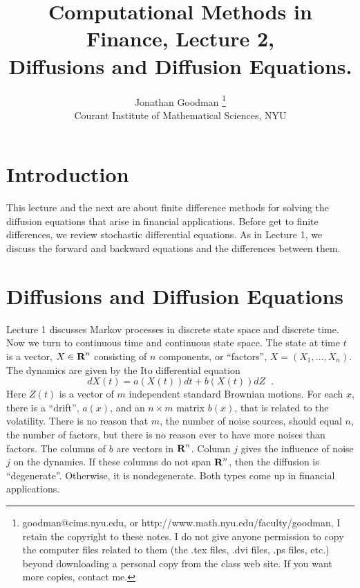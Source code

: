 


\title{Computational Methods in Finance, Lecture 2, \\
       Diffusions and Diffusion Equations.}

\author{Jonathan Goodman \thanks{goodman@cims.nyu.edu, or http://www.math.nyu.edu/faculty/goodman,  I retain the copyright to
these notes.  I do not give anyone permission to copy the computer
files related to them (the .tex files, .dvi files, .ps files, etc.)
beyond downloading a personal copy from the class web site.
If you want more copies, contact me.} \\
Courant Institute of Mathematical Sciences, NYU }
\maketitle



\section{Introduction}

This lecture and the next are about finite difference methods for solving
the diffusion equations that arise in financial applications.  Before get
to finite differences, we review stochastic differential equations.  As in
Lecture 1, we discuss the forward and backward equations and the differences
between them.

\section{Diffusions and Diffusion Equations}

Lecture 1 discusses Markov processes in discrete state space and discrete time.
Now we turn to continuous time and continuous state space.  The state at time
$t$ is a vector, $X \in \mbox{\bf R}^n$ consisting of $n$ components, or
``factors'', $X = (X_1, \ldots, X_n)$.  The dynamics are given by the
Ito differential equation
\begin{equation}
dX(t) = a(X(t))dt + b(X(t))dZ \;\; .
\end{equation}
Here $Z(t)$ is a vector of $m$ independent standard Brownian motions.
For each $x$, there is a ``drift'', $a(x)$, and an $n \times m$ matrix
$b(x)$, that is related to the volatility.  There is no reason that
$m$, the number of noise sources, should equal $n$, the number of factors,
but there is no reason ever to have more noises than factors.  The columns
of $b$ are vectors in $\mbox{\bf R}^n$.  Column $j$ gives the influence
of noise $j$ on the dynamics.  If these columns do not span
$\mbox{\bf R}^n$, then the diffusion is ``degenerate''.  Otherwise,
it is nondegenerate.  Both types come up in financial applications.

